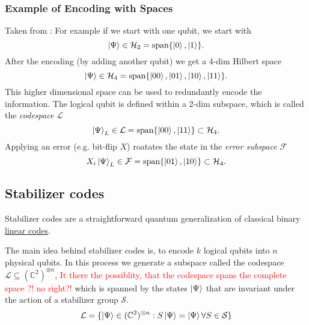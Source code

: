 \subsubsection{Example of Encoding with Spaces}
Taken from \cite{QECintro}: 
For example if we start with one qubit, we start with 
\begin{equation}
    \ket{\Psi} \in \mathcal{H}_2 = \text{span}\{\ket{0},\ket{1} \}.
\end{equation}
After the encoding (by adding another qubit) we get a 4-dim Hilbert space 
\begin{equation}
    \ket{\Psi} \in \mathcal{H}_4 = \text{span}\{\ket{00},\ket{01},\ket{10},\ket{11} \}.
\end{equation}
This higher dimensional space can be used to redundantly encode the information.
The logical qubit is defined within a 2-dim subspace, which is called the \textit{codespace} $\mathcal{L}$
\begin{equation}
    \ket{\Psi}_L \in \mathcal{L} = \text{span}\{\ket{00},\ket{11} \} \subset \mathcal{H}_4.
\end{equation}
Applying an error (e.g. bit-flip $X$) roatates the state in the \textit{error subspace} $\mathcal{F}$
\begin{equation}
    X_i \ket{\Psi}_L \in \mathcal{F} = \text{span}\{\ket{01},\ket{10} \} \subset \mathcal{H}_4.
\end{equation} 


\subsection{Stabilizer codes}\label{sec:basic.qc.stabilizer}
Stabilizer codes are a straightforward quantum generalization of classical binary \hyperref[sec:basic.math.linear_codes]{linear codes}. \cite{QECmemory}

The main idea behind stabilizer codes is, to encode $k$ logical qubits into $n$ physical qubits.
In this process we generate a subspace called the codespace $\mathcal{L} \subseteq (\mathbb{C}^2)^{\otimes n}$,
\textcolor{red}{It there the possiblity, that the codespace spans the complete space ?! no right?!} 
which is spanned by the states $\ket{\Psi}$ that are invariant under the action of a stabilizer group $\mathcal{S}$. \cite{QECmemory}
\begin{equation}
    \mathcal{L} = \{ \ket{\Psi} \in (\mathbb{C}^2)^{\otimes n}: S\ket{\Psi}=\ket{\Psi}  \forall S \in \mathcal{S}\}
\end{equation}

